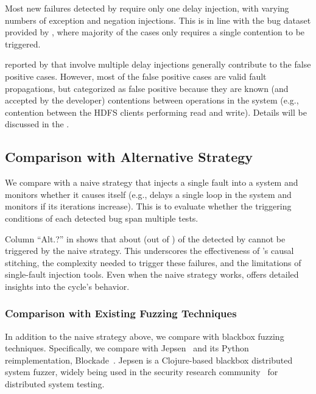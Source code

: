 Most new failures detected by \tool require only one delay injection, with varying numbers of exception and negation injections. 
This is in line with the bug dataset provided by \citet{qian2023vicious}, where majority of the cases only requires a single contention to be triggered. 

\Vcs reported by \tool that involve multiple delay injections generally contribute to the false positive cases. 
However, most of the false positive cases 
are valid fault propagations, 
but categorized as false positive 
because they are known (and accepted by the developer) 
contentions between operations in the system 
(e.g., contention between the HDFS clients performing read and write). 
Details will be discussed in the .


\subsection{Comparison with Alternative Strategy}
\label{sec:eval:alt}

We compare \tool with a naive strategy that 
injects a single fault into a system and monitors whether it causes itself 
(e.g., delays a single loop in the system and monitors if its iterations increase). 
This is to evaluate whether the triggering conditions of each detected bug span multiple tests.

Column ``Alt.?'' in  shows that about \NoNaivePctg (\NumOfNewVCNaive out of \NumOfNewVC) of the \vcs detected by \tool cannot be triggered by the naive strategy. 
This underscores the effectiveness of \tool's causal stitching, the complexity needed to trigger these failures, and the limitations of single-fault injection tools. Even when the naive strategy works, \tool offers detailed insights into the cycle's behavior.

\subsubsection{Comparison with Existing Fuzzing Techniques}

In addition to the naive strategy above, we compare \tool with blackbox fuzzing techniques. Specifically, we compare with Jepsen~\cite{jepsenio} and its Python reimplementation, Blockade~\cite{blockadetest}. Jepsen is a Clojure-based blackbox distributed system fuzzer, widely being used in the security research community~\cite{meng2023greybox,zou2025blackbox} for distributed system testing.

